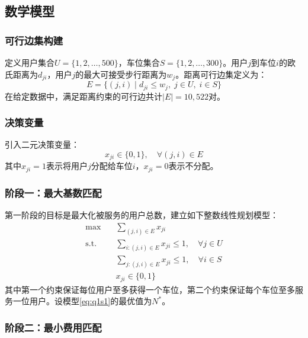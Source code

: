 \documentclass[12pt,a4paper]{ctexart}
\begin{document}
\subsection{数学模型}

\subsubsection{可行边集构建}

定义用户集合$U=\{1,2,\ldots,500\}$，车位集合$S=\{1,2,\ldots,300\}$。用户$j$到车位$i$的欧氏距离为$d_{ji}$，用户$j$的最大可接受步行距离为$w_j$。距离可行边集定义为：
\begin{equation}
  E = \{(j,i) \mid d_{ji} \leq w_j,\; j\in U,\; i\in S\}
\end{equation}
在给定数据中，满足距离约束的可行边共计$|E|=10{,}522$对。

\subsubsection{决策变量}

引入二元决策变量：
\begin{equation}
  x_{ji} \in \{0,1\},\quad \forall (j,i) \in E
\end{equation}
其中$x_{ji}=1$表示将用户$j$分配给车位$i$，$x_{ji}=0$表示不分配。

\subsubsection{阶段一：最大基数匹配}

第一阶段的目标是最大化被服务的用户总数，建立如下整数线性规划模型：
\begin{equation}\label{eq:q1s1}
  \begin{aligned}
    \max \quad & \sum_{(j,i) \in E} x_{ji} \\
    \text{s.t.} \quad & \sum_{i: (j,i) \in E} x_{ji} \leq 1, \quad \forall j \in U \\
    & \sum_{j: (j,i) \in E} x_{ji} \leq 1, \quad \forall i \in S \\
    & x_{ji} \in \{0, 1\}
  \end{aligned}
\end{equation}
其中第一个约束保证每位用户至多获得一个车位，第二个约束保证每个车位至多服务一位用户。设模型\eqref{eq:q1s1}的最优值为$N^*$。

\subsubsection{阶段二：最小费用匹配}
\end{document}
